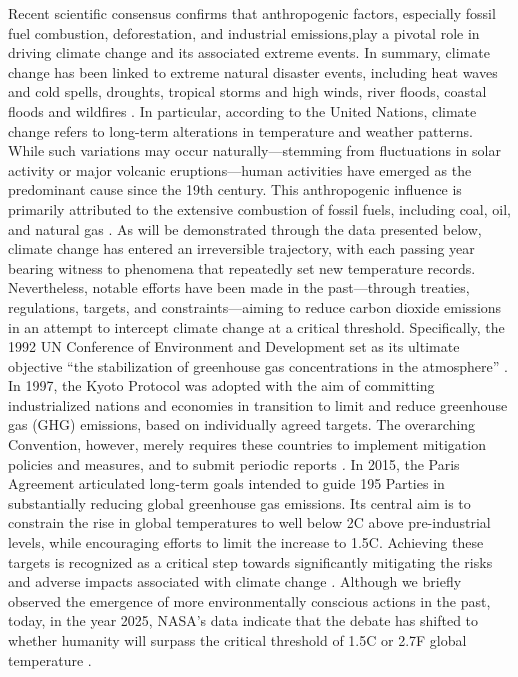 \documentclass[12pt]{Definitions/academia}
\begin{document}
Recent scientific consensus confirms that anthropogenic factors, especially
fossil fuel combustion, deforestation, and industrial emissions,play
a pivotal role in driving climate change and its associated extreme
events. In summary, climate change has been linked to extreme natural
disaster events, including heat waves and cold spells, droughts, tropical
storms and high winds, river floods, coastal floods \textit{\cite{Dey 2021}}
and wildfires \textit{\cite{Kopitsa,United Nations  2022}}. In particular,
according to the United Nations, climate change refers to long-term
alterations in temperature and weather patterns. While such variations
may occur naturally---stemming from fluctuations in solar activity
or major volcanic eruptions---human activities have emerged as the
predominant cause since the 19th century. This anthropogenic influence
is primarily attributed to the extensive combustion of fossil fuels,
including coal, oil, and natural gas \textit{\cite{United Nations}}.
As will be demonstrated through the data presented below, climate
change has entered an irreversible trajectory, with each passing year
bearing witness to phenomena that repeatedly set new temperature records.
Nevertheless, notable efforts have been made in the past---through
treaties, regulations, targets, and constraints---aiming to reduce
carbon dioxide emissions in an attempt to intercept climate change
at a critical threshold. Specifically, the 1992 UN Conference of Environment
and Development set as its ultimate objective \textquotedblleft the
stabilization of greenhouse gas concentrations in the atmosphere\textquotedblright{}
\textit{\cite{United Nations 1992}}. In 1997, the Kyoto Protocol
was adopted with the aim of committing industrialized nations and
economies in transition to limit and reduce greenhouse gas (GHG) emissions,
based on individually agreed targets. The overarching Convention,
however, merely requires these countries to implement mitigation policies
and measures, and to submit periodic reports \textit{\cite{United Nations 1997}.}
In 2015, the Paris Agreement articulated long-term goals intended
to guide 195 Parties in substantially reducing global greenhouse gas
emissions. Its central aim is to constrain the rise in global temperatures
to well below 2\textdegree C above pre-industrial levels, while encouraging efforts
to limit the increase to 1.5\textdegree C. Achieving these targets is recognized
as a critical step towards significantly mitigating the risks and
adverse impacts associated with climate change \textit{\cite{United Nations 2015}.}
Although we briefly observed the emergence of more environmentally
conscious actions in the past, today, in the year 2025, NASA's data
indicate that the debate has shifted to whether humanity will surpass
the critical threshold of 1.5\textdegree C or 2.7\textdegree F global temperature \textit{\cite{NASA 2024}}.
\end{document}
